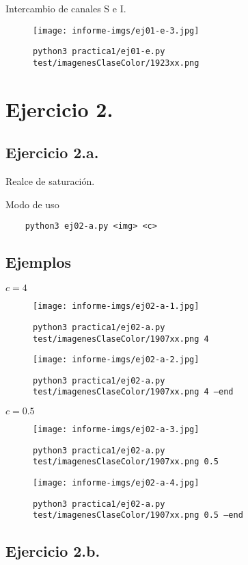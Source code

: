 \documentclass[11pt, spanish]{article}
\begin{document}
Intercambio de canales S e I.
\begin{figure}[H]
\centering
  \texttt{[image: informe-imgs/ej01-e-3.jpg]}
  \caption{\texttt{python3 practica1/ej01-e.py test/imagenesClaseColor/1923xx.png}}
\end{figure}

\newpage

\section{Ejercicio 2.}
\subsection{Ejercicio 2.a.}

Realce de saturación.

Modo de uso
\begin{verbatim}
    python3 ej02-a.py <img> <c>
\end{verbatim}

\subsection*{Ejemplos}
$c = 4$
\begin{figure}[H]
\centering
  \texttt{[image: informe-imgs/ej02-a-1.jpg]}
  \caption{\texttt{python3 practica1/ej02-a.py test/imagenesClaseColor/1907xx.png 4}}
\end{figure}
\begin{figure}[H]
\centering
  \texttt{[image: informe-imgs/ej02-a-2.jpg]}
  \caption{\texttt{python3 practica1/ej02-a.py test/imagenesClaseColor/1907xx.png 4 --end}}
\end{figure}

$c = 0.5$
\begin{figure}[H]
\centering
  \texttt{[image: informe-imgs/ej02-a-3.jpg]}
  \caption{\texttt{python3 practica1/ej02-a.py test/imagenesClaseColor/1907xx.png 0.5}}
\end{figure}

\begin{figure}[H]
\centering
  \texttt{[image: informe-imgs/ej02-a-4.jpg]}
  \caption{\texttt{python3 practica1/ej02-a.py test/imagenesClaseColor/1907xx.png 0.5 --end}}
\end{figure}

\subsection{Ejercicio 2.b.}
\end{document}
